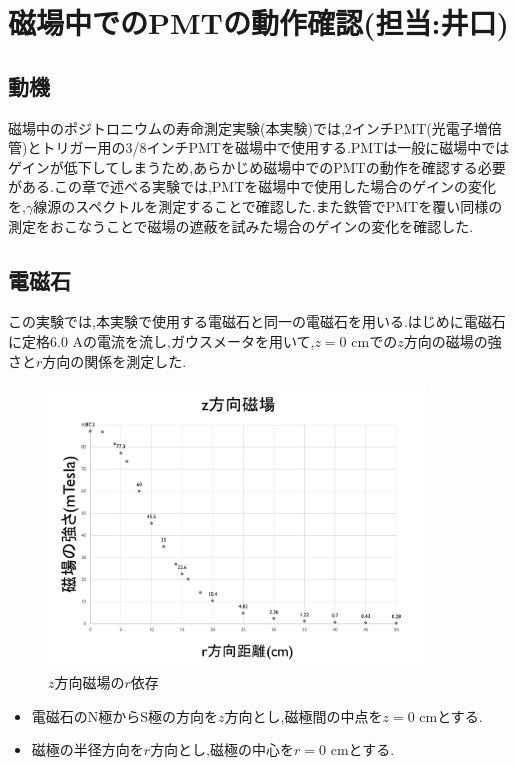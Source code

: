 \chapter{磁場中でのPMTの動作確認(担当:井口)}\label{PMT}

\section{動機}
磁場中のポジトロニウムの寿命測定実験(本実験)では,2インチPMT(光電子増倍管)とトリガー用の3/8インチPMTを磁場中で使用する.PMTは一般に磁場中ではゲインが低下してしまうため,あらかじめ磁場中でのPMTの動作を確認する必要がある.この章で述べる実験では,PMTを磁場中で使用した場合のゲインの変化を,$\gamma$線源のスペクトルを測定することで確認した.また鉄管でPMTを覆い同様の測定をおこなうことで磁場の遮蔽を試みた場合のゲインの変化を確認した.



\section{電磁石}
この実験では,本実験で使用する電磁石と同一の電磁石を用いる.はじめに電磁石に定格6.0 Aの電流を流し,ガウスメータを用いて,$z=0$ cmでの$z$方向の磁場の強さと$r$方向の関係を測定した.
\begin{figure}[htbp]
	\centering
		\includegraphics[width=10cm]{fig/iguchi/maggraph1.pdf}
	\caption{$z$方向磁場の$r$依存}
	\label{maggraph1}
\end{figure}

\begin{itemize}
       \item 電磁石のN極からS極の方向を$z$方向とし,磁極間の中点を$z=0$ cmとする.
       \item 磁極の半径方向を$r$方向とし,磁極の中心を$r=0$ cmとする.
\end{itemize}

